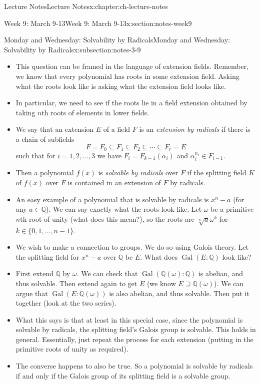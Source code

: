 \documentclass[oneside,11pt,]{book}
\begin{document}
\begin{chapterptx}{Lecture Notes}{}{Lecture Notes}{}{}{x:chapter:ch-lecture-notes}
\begin{sectionptx}{Week 9: March 9-13}{}{Week 9: March 9-13}{}{}{x:section:notes-week9}
\begin{subsectionptx}{Monday and Wednesday: Solvability by Radicals}{}{Monday and Wednesday: Solvability by Radicals}{}{}{x:subsection:notes-3-9}
\begin{itemize}[label=\textbullet]
\item{}This question can be framed in the language of extension fields. Remember, we know that every polynomial has roots in some extension field. Asking what the roots look like is asking what the extension field looks like.%
\item{}In particular, we need to see if the roots lie in a field extension obtained by taking \(n\)th roots of elements in lower fields.%
\item{}We say that an extension \(E\) of a field \(F\) is an \emph{extension by radicals} if there is a chain of subfields%
\begin{equation*}
F = F_0 \subseteq F_1 \subseteq F_2 \subseteq \cdots \subseteq F_r = E
\end{equation*}
such that for \(i = 1,2,\ldots, 3\) we have \(F_i = F_{k-1}(\alpha_i)\) and \(\alpha_i^{n_i} \in F_{i-1}\).%
\item{}Then a polynomial \(f(x)\) is \emph{solvable by radicals} over \(F\) if the splitting field \(K\) of \(f(x)\) over \(F\) is contained in an extension of \(F\) by radicals.%
\item{}An easy example of a polynomial that is solvable by radicals is \(x^n - a\) (for any \(a \in \mathbb Q\)). We can say exactly what the roots look like. Let \(\omega\) be a primitive \(n\)th root of unity (what does this mean?), so the roots are \(\sqrt[n]{a}\omega^{k}\) for \(k \in \{0,1,\ldots, n-1\}\).%
\item{}We wish to make a connection to groups. We do so using Galois theory. Let the splitting field for \(x^n - a\) over \(\mathbb Q\) be \(E\). What does \(\mathop{\mathrm{Gal}}(E:\mathbb Q)\) look like?%
\item{}First extend \(\mathbb Q\) by \(\omega\). We can check that \(\mathop{\mathrm{Gal}}(\mathbb Q(\omega):\mathbb Q)\) is abelian, and thus solvable. Then extend again to get \(E\) (we know \(E \supseteq \mathbb Q(\omega)\)). We can argue that \(\mathop{\mathrm{Gal}}(E:\mathbb Q(\omega))\) is also abelian, and thus solvable. Then put it together (look at the two series).%
\item{}What this says is that at least in this special case, since the polynomial is solvable by radicals, the splitting field’s Galois group is solvable. This holds in general. Essentially, just repeat the process for each extension (putting in the primitive roots of unity as required).%
\item{}The converse happens to also be true. So a polynomial is solvable by radicals if and only if the Galois group of its splitting field is a solvable group.%

\end{itemize}
\end{subsectionptx}
\end{sectionptx}
\end{chapterptx}
\end{document}
